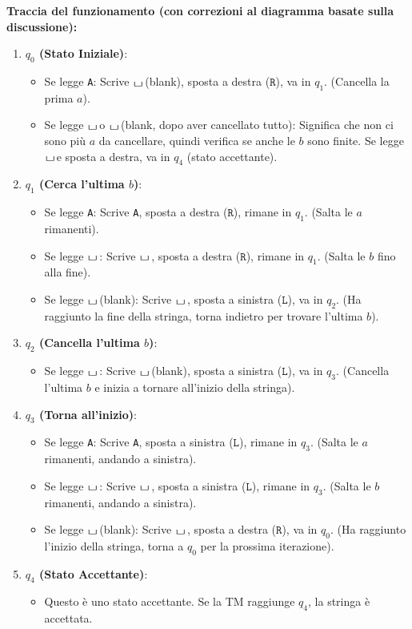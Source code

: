 \documentclass[a4paper]{article}
\theoremstyle{definition} %
\newcommand{\blankS}{\ensuremath{\raisebox{-0.15ex}{\scalebox{1.3}[0.7]{$\sqcup$}}\mkern2mu}}
\begin{document}
\textbf{Traccia del funzionamento (con correzioni al diagramma basate sulla discussione):}
\begin{enumerate}
    \item \textbf{$q_0$ (Stato Iniziale)}:
        \begin{itemize}
            \item Se legge \texttt{A}: Scrive \blankS (blank), sposta a destra ($\texttt{R}$), va in $q_1$. (Cancella la prima $a$).
            \item Se legge \blankS o \blankS (blank, dopo aver cancellato tutto): Significa che non ci sono più $a$ da cancellare, quindi verifica se anche le $b$ sono finite. Se legge \blankS e sposta a destra, va in $q_4$ (stato accettante).
        \end{itemize}
    \item \textbf{$q_1$ (Cerca l'ultima $b$)}:
        \begin{itemize}
            \item Se legge \texttt{A}: Scrive \texttt{A}, sposta a destra ($\texttt{R}$), rimane in $q_1$. (Salta le $a$ rimanenti).
            \item Se legge \blankS: Scrive \blankS, sposta a destra ($\texttt{R}$), rimane in $q_1$. (Salta le $b$ fino alla fine).
            \item Se legge \blankS (blank): Scrive \blankS, sposta a sinistra ($\texttt{L}$), va in $q_2$. (Ha raggiunto la fine della stringa, torna indietro per trovare l'ultima $b$).
        \end{itemize}
    \item \textbf{$q_2$ (Cancella l'ultima $b$)}:
        \begin{itemize}
            \item Se legge \blankS: Scrive \blankS (blank), sposta a sinistra ($\texttt{L}$), va in $q_3$. (Cancella l'ultima $b$ e inizia a tornare all'inizio della stringa).
        \end{itemize}
    \item \textbf{$q_3$ (Torna all'inizio)}:
        \begin{itemize}
            \item Se legge \texttt{A}: Scrive \texttt{A}, sposta a sinistra ($\texttt{L}$), rimane in $q_3$. (Salta le $a$ rimanenti, andando a sinistra).
            \item Se legge \blankS: Scrive \blankS, sposta a sinistra ($\texttt{L}$), rimane in $q_3$. (Salta le $b$ rimanenti, andando a sinistra).
            \item Se legge \blankS (blank): Scrive \blankS, sposta a destra ($\texttt{R}$), va in $q_0$. (Ha raggiunto l'inizio della stringa, torna a $q_0$ per la prossima iterazione).
        \end{itemize}
    \item \textbf{$q_4$ (Stato Accettante)}:
        \begin{itemize}
            \item Questo è uno stato accettante. Se la TM raggiunge $q_4$, la stringa è accettata.
        \end{itemize}
\end{enumerate}
\end{document}
